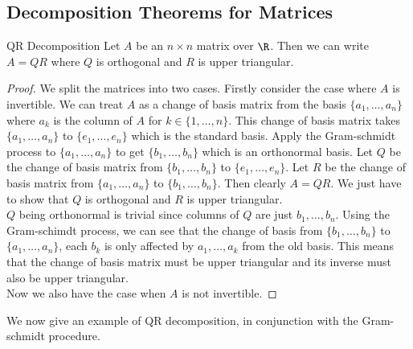 \documentclass[a4paper]{article}
\begin{document}
\subsection{Decomposition Theorems for Matrices}
\begin{thm}{QR Decomposition}{} Let $A$ be an $n\times n$ matrix over $\R$. Then we can write $A=QR$ where $Q$ is orthogonal and $R$ is upper triangular. 
\begin{proof}We split the matrices into two cases. Firstly consider the case where $A$ is invertible. We can treat $A$ as a change of basis matrix from the basis $\{a_1,\dots,a_n\}$ where $a_k$ is the column of $A$ for $k\in\{1,\dots,n\}$. This change of basis matrix takes $\{a_1,\dots,a_n\}$ to $\{e_1,\dots,e_n\}$ which is the standard basis. Apply the Gram-schmidt process to $\{a_1,\dots,a_n\}$ to get $\{b_1,\dots,b_n\}$ which is an orthonormal basis. Let $Q$ be the change of basis matrix from $\{b_1,\dots,b_n\}$ to $\{e_1,\dots,e_n\}$. Let $R$ be the change of basis matrix from $\{a_1,\dots,a_n\}$ to $\{b_1,\dots,b_n\}$. Then clearly $A=QR$. We just have to show that $Q$ is orthogonal and $R$ is upper triangular. \\
$Q$ being orthonormal is trivial since columns of $Q$ are just $b_1,\dots,b_n$. Using the Gram-schimdt process, we can see that the change of basis from $\{b_1,\dots,b_n\}$ to $\{a_1,\dots,a_n\}$, each $b_k$ is only affected by $a_1,\dots,a_k$ from the old basis. This means that the change of basis matrix must be upper triangular and its inverse must also be upper triangular. \\
Now we also have the case when $A$ is not invertible. 
\end{proof}
\end{thm}

We now give an example of QR decomposition, in conjunction with the Gram-schmidt procedure. 
\end{document}
